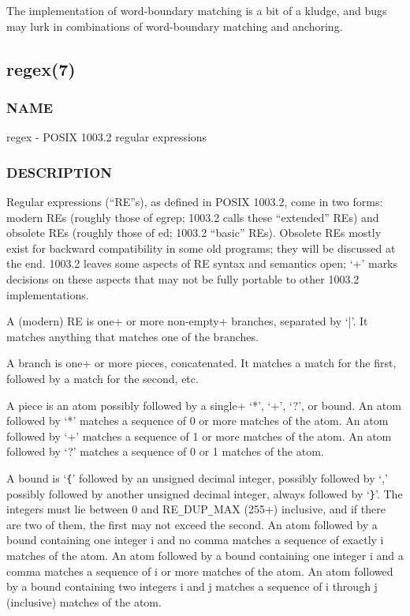 The implementation of word-boundary matching is a bit of a kludge, and
bugs may lurk in combinations of word-boundary matching and anchoring.

\subsection{regex(7)}%
\label{sec:manre7}

\subsubsection{NAME}

regex - POSIX 1003.2 regular expressions  

\subsubsection{DESCRIPTION}

Regular expressions (``RE''s), as defined in POSIX 1003.2, come in two
forms: modern REs (roughly those of egrep; 1003.2 calls these
``extended'' REs) and obsolete REs (roughly those of ed; 1003.2
``basic'' REs). Obsolete REs mostly exist for backward compatibility
in some old programs; they will be discussed at the end. 1003.2 leaves
some aspects of RE syntax and semantics open; `+' marks decisions on
these aspects that may not be fully portable to other 1003.2
implementations.

A (modern) RE is one+ or more non-empty+ branches, separated by `|'.
It matches anything that matches one of the branches.

A branch is one+ or more pieces, concatenated. It matches a match for
the first, followed by a match for the second, etc.

A piece is an atom possibly followed by a single+ `*', `+', `?', or
bound. An atom followed by `*' matches a sequence of 0 or more matches
of the atom. An atom followed by `+' matches a sequence of 1 or more
matches of the atom. An atom followed by `?' matches a sequence of 0
or 1 matches of the atom.

A bound is `\verb|{|' followed by an unsigned decimal integer,
possibly followed by `,' possibly followed by another unsigned
decimal integer, always followed by `\verb|}|'. The integers must
lie between 0 and RE\verb|_|DUP\verb|_|MAX (255+) inclusive, and if
there are two of them, the first may not exceed the second. An atom
followed by a bound containing one integer i and no comma matches a
sequence of exactly i matches of the atom. An atom followed by a bound
containing one integer i and a comma matches a sequence of i or more
matches of the atom. An atom followed by a bound containing two
integers i and j matches a sequence of i through j (inclusive) matches
of the atom.

